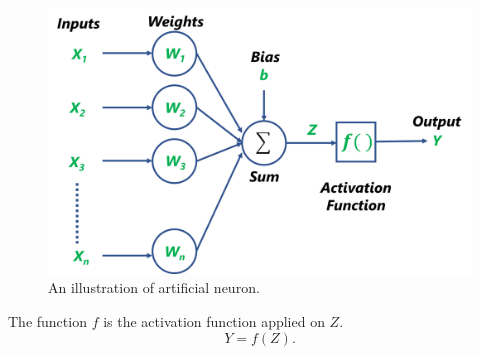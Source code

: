\begin{figure}[H]
        \begin{center}
	    \includegraphics[scale=0.30]{images/Fundamentals/artificialNeuron.png}
	    \caption[An illustration of artificial neuron.]{An illustration of artificial neuron.}
	    \label{fig:artificialNeuron}
	    \end{center}
\end{figure}

The function $f$ is the activation function applied on $Z$.
\begin{equation}\label{artificialNeuron}
Y = f(Z).
\end{equation}


